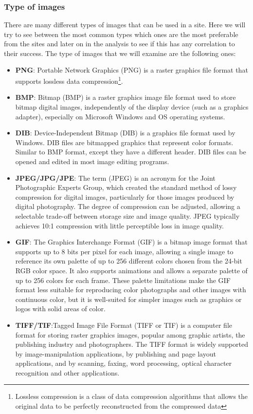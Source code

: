 \documentclass{book}
\begin{document}
\subsubsection{Type of images}
There are many different types of images that can be used in a site. Here we will try to see between the most common types which ones are the most preferable from the sites and later on in the analysis to see if this has any correlation to their success. The type of images that we will examine are the following ones:
\begin{itemize}
\item \textbf{PNG}: Portable Network Graphics (PNG) is a raster graphics file format that supports lossless data compression\footnote{Lossless compression is a class of data compression algorithms that allows the original data to be perfectly reconstructed from the compressed data}.
\item \textbf{BMP}: Bitmap (BMP) is a raster graphics image file format used to store bitmap digital images, independently of the display device (such as a graphics adapter), especially on Microsoft Windows and OS operating systems.
\item \textbf{DIB}: Device-Independent Bitmap (DIB) is a graphics file format used by Windows. DIB files are bitmapped graphics that represent color formats. Similar to BMP format, except they have a different header. DIB files can be opened and edited in most image editing programs.
\item \textbf{JPEG/JPG/JPE}: The term (JPEG) is an acronym for the Joint Photographic Experts Group, which created the standard method of lossy compression for digital images, particularly for those images produced by digital photography. The degree of compression can be adjusted, allowing a selectable trade-off between storage size and image quality. JPEG typically achieves 10:1 compression with little perceptible loss in image quality.
\item \textbf{GIF}: The Graphics Interchange Format (GIF) is a bitmap image format that supports up to 8 bits per pixel for each image, allowing a single image to reference its own palette of up to 256 different colors chosen from the 24-bit RGB color space. It also supports animations and allows a separate palette of up to 256 colors for each frame. These palette limitations make the GIF format less suitable for reproducing color photographs and other images with continuous color, but it is well-suited for simpler images such as graphics or logos with solid areas of color.
\item \textbf{TIFF/TIF}:Tagged Image File Format (TIFF or TIF) is a computer file format for storing raster graphics images, popular among graphic artists, the publishing industry and photographers. The TIFF format is widely supported by image-manipulation applications, by publishing and page layout applications, and by scanning, faxing, word processing, optical character recognition and other applications.
\end{itemize}
\end{document}
